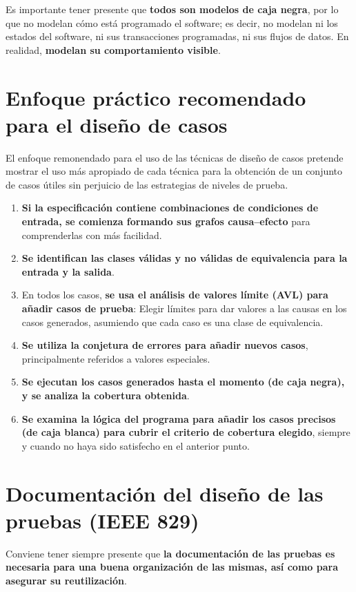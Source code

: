Es importante tener presente que \textbf{todos son modelos de caja negra}, por lo que no modelan cómo está programado el software; es decir, no modelan ni los estados del software, ni sus transacciones programadas, ni sus flujos de datos. En realidad, \textbf{modelan su comportamiento visible}.


\section{Enfoque práctico recomendado para el diseño de casos}

El enfoque remonendado para el uso de las técnicas de diseño de casos pretende mostrar el uso más apropiado de cada técnica para la obtención de un conjunto de casos útiles sin perjuicio de las estrategias de niveles de prueba.

\begin{enumerate}
    \item \textbf{Si la especificación contiene combinaciones de condiciones de entrada, se comienza formando sus grafos causa--efecto} para comprenderlas con más facilidad.
    \item \textbf{Se identifican las clases válidas y no válidas de equivalencia para la entrada y la salida}.
    \item En todos los casos, \textbf{se usa el análisis de valores límite (AVL) para añadir casos de prueba}: Elegir límites para dar valores a las causas en los casos generados, asumiendo que cada caso es una clase de equivalencia.
    \item \textbf{Se utiliza la conjetura de errores para añadir nuevos casos}, principalmente referidos a valores especiales.
    \item \textbf{Se ejecutan los casos generados hasta el momento (de caja negra), y se analiza la cobertura obtenida}.
    \item \textbf{Se examina la lógica del programa para añadir los casos precisos (de caja blanca) para cubrir el criterio de cobertura elegido}, siempre y cuando no haya sido satisfecho en el anterior punto.
\end{enumerate}


\section{Documentación del diseño de las pruebas (IEEE 829)}

Conviene tener siempre presente que \textbf{la documentación de las pruebas es necesaria para una buena organización de las mismas, así como para asegurar su reutilización}.\\

